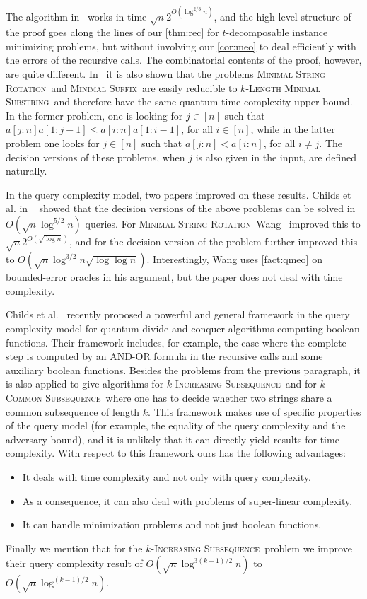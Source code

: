 \documentclass[12pt]{article}
\newcommand{\ISf}{\textsc{Increasing Subsequence}}
\newcommand{\LMSf}{\textsc{Length Minimal Substring}}
\newcommand{\MSRf}{\textsc{Minimal String Rotation}}
\newcommand{\MSf}{\textsc{Minimal Suffix}}
\newcommand{\CSf}{\textsc{Common Subsequence}}
\theoremstyle{definition}
\begin{document}
The algorithm in~\cite{AJ22} works in time $\sqrt{n} 2^{O(\log^{2/3} n)}$, and the high-level structure of the proof goes along the lines of our \cref{thm:rec} for $t$-decomposable instance minimizing problems, but without involving our \cref{cor:meo} to deal efficiently with the errors of the recursive calls.
The combinatorial contents of the proof, however, are quite different.
In~\cite{AJ22} it is also shown that the problems \MSRf \ and \MSf \ are easily reducible to $k$-\LMSf \ and therefore have the same quantum time complexity upper bound. In the former problem, one is looking for $j \in [n]$ such that $a[j:n]a[1:j-1] \leq a[i:n]a[1:i-1]$, for all $i \in [n]$, while in the latter problem one looks for $j \in [n]$ such that $a[j:n] < a[i:n]$, for all $i \neq j$. The decision versions of these problems, when $j$ is also given in the input, are defined naturally.

In the query complexity model, two papers improved on these results. 
Childs et al. in ~\cite{CKKSW22} showed that the decision versions of the above problems can be solved in $O(\sqrt{n} \log^{5/2} n)$ queries.
For \MSRf \ Wang~\cite{Wan22} improved this to $\sqrt{n} 2^{O(\sqrt{\log n})}$, and for the decision version of the problem further improved this to $O(\sqrt{n} \log^{3/2} n \sqrt{\log \log n})$. Interestingly, Wang uses \cref{fact:qmeo} on bounded-error oracles in his argument, but the paper does not deal with time complexity.

Childs et al.~\cite{CKKSW22} recently proposed a powerful and general framework in the query complexity model for quantum divide and conquer algorithms computing boolean functions. Their framework includes, for example, the case where the complete step is computed by an AND-OR formula in the recursive calls and some auxiliary boolean functions. Besides the problems from the previous paragraph, it is also applied to give algorithms for $k$-\ISf \ and for $k$-\CSf \ where one has to decide whether two strings share a common subsequence of length $k$.
This framework makes use of specific properties of the query model (for example, the equality of the query complexity and the adversary bound), and it is unlikely that it can directly yield results for time complexity. With respect to this framework ours has the following advantages:
\begin{itemize}
\item
It deals with time complexity and not only with query complexity.
\item
As a consequence, it can also deal with problems of super-linear complexity.
\item
It can handle minimization problems and not just boolean functions.
\end{itemize}
Finally we mention that for the $k$-\ISf \ problem we improve their query complexity result of $O(\sqrt{n} \log^{3(k-1)/2} n)$ to $O(\sqrt{n} \log^{(k-1)/2} n)$.
\end{document}
